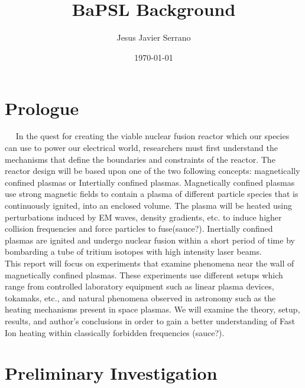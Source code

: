 \documentclass[11pt]{article}
\title{\vspace{-50pt}
\Huge \name
\\\vspace{20pt}
\huge BaPSL \hfill Background \hw}
\author{%
Jesus Javier Serrano}
\date{\today}
\theoremstyle{quest}
\begin{document}
\maketitle

\section{Prologue}
~~ In the quest for creating the viable nuclear fusion reactor which our species can use to power our electrical world, researchers must first understand the mechanisms that define the boundaries and constraints of the reactor. The reactor design will be based upon one of the two following concepts: magnetically confined plasmas or Intertially confined plasmas. Magnetically confined plasmas use strong magnetic fields to contain a plasma of different particle species that is continuously ignited, into an enclosed volume. The plasma will be heated using perturbations induced by EM waves, density gradients, etc. to induce higher collision frequencies and force particles to fuse(sauce?). Inertially confined plasmas are ignited and undergo nuclear fusion within a short period of time by bombarding a tube of tritium isotopes with high intensity laser beams.\\

This report will focus on experiments that examine phenomena near the wall of magnetically confined plasmas. These experiments use different setups which range from controlled laboratory equipment such as linear plasma devices, tokamaks, etc., and natural phenomena observed in astronomy such as the heating mechanisms present in space plasmas. We will examine the theory, setup, results, and author's conclusions in order to gain a better understanding of Fast Ion heating within classically forbidden frequencies (sauce?).\\

\section{Preliminary Investigation}
\end{document}
